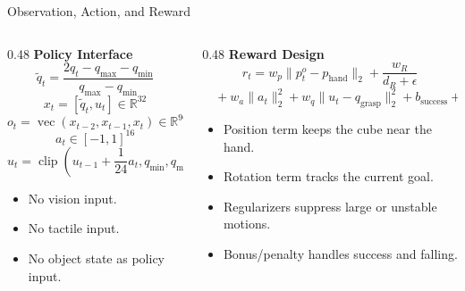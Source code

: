 \documentclass{beamer}
\begin{document}
\begin{frame}{Observation, Action, and Reward}
    \footnotesize
    \vspace{0.7em}
    \begin{columns}[T,onlytextwidth]
        \begin{column}{0.48\textwidth}
            \textbf{\textcolor{maincolor}{Policy Interface}}
            \[
                \tilde q_t =
                \frac{2q_t-q_{\max}-q_{\min}}
                     {q_{\max}-q_{\min}}
            \]
            \[
                x_t=[\tilde q_t,u_t]\in\mathbb{R}^{32}
            \]
            \[
                o_t=
                \operatorname{vec}(x_{t-2},x_{t-1},x_t)
                \in\mathbb{R}^{96}
            \]
            \[
                a_t\in[-1,1]^{16}
            \]
            \[
                u_t=
                \operatorname{clip}
                \left(
                    u_{t-1}+\frac{1}{24}a_t,
                    q_{\min},
                    q_{\max}
                \right)
            \]

            \vspace{0.1em}
            \begin{itemize}
                \item No vision input.
                \item No tactile input.
                \item No object state as policy input.
            \end{itemize}
        \end{column}
        \begin{column}{0.48\textwidth}
            \textbf{\textcolor{maincolor}{Reward Design}}
            \[
                r_t =
                w_p\|p^o_t-p_{\mathrm{hand}}\|_2
                +
                \frac{w_R}{d_R+\epsilon}
            \]
            \[
                \quad
                +w_a\|a_t\|_2^2
                +w_q\|u_t-q_{\mathrm{grasp}}\|_2^2
                +b_{\mathrm{success}}
                +b_{\mathrm{fall}}
            \]

            \vspace{0.1em}
            \begin{itemize}
                \item Position term keeps the cube near the hand.
                \item Rotation term tracks the current goal.
                \item Regularizers suppress large or unstable motions.
                \item Bonus/penalty handles success and falling.
            \end{itemize}
        \end{column}
    \end{columns}
\end{frame}
\end{document}

